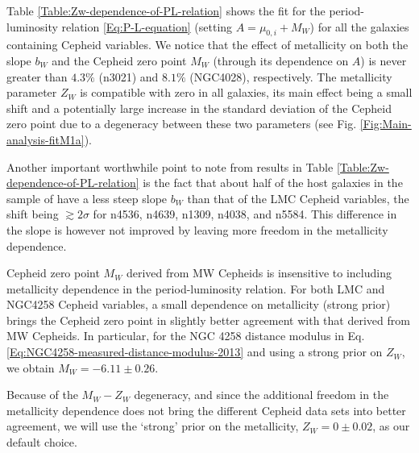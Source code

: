 Table \ref{Table:Zw-dependence-of-PL-relation} shows the fit for the period-luminosity relation \eqref{Eq:P-L-equation}  (setting $A=\mu_{0,i} + M_W$) for all the galaxies containing Cepheid variables. We notice that the effect of metallicity on both the slope $b_W$ and the Cepheid zero point $M_W$ (through its dependence on $A$) is never greater than $4.3\%$ (n3021) and $8.1\%$ (NGC4028), respectively. The metallicity parameter $Z_W$ is compatible with zero in all galaxies, its main effect being a small shift and a potentially large increase in the standard deviation of the Cepheid zero point due to a degeneracy between these two parameters (see Fig. \ref{Fig:Main-analysis-fitM1a}). 

Another important worthwhile point to note from results in Table \ref{Table:Zw-dependence-of-PL-relation} is the fact that about half of the host galaxies in the sample of \cite{Riess:2011yx} have a less steep slope $b_W$ than that of the LMC Cepheid variables, the shift being $\gtrsim 2\sigma$ for n4536, n4639, n1309, n4038, and n5584. This difference in the slope is however not improved by leaving more freedom in the metallicity dependence.

Cepheid zero point $M_W$ derived from MW Cepheids is insensitive to including metallicity dependence in the period-luminosity relation. For both LMC and NGC4258 Cepheid variables, a small dependence on metallicity (strong prior) brings the Cepheid zero point in slightly better agreement with that derived from MW Cepheids. In particular, for the NGC 4258 distance modulus in Eq. \eqref{Eq:NGC4258-measured-distance-modulus-2013} and using a strong prior on $Z_W$, we obtain $M_W=-6.11 \pm 0.26$.

Because of the $M_W - Z_W$ degeneracy, and since the additional freedom in the metallicity dependence does not bring the different Cepheid data sets into better agreement,
we will use the `strong' prior on the metallicity, $Z_W = 0 \pm 0.02$, as our default choice.

